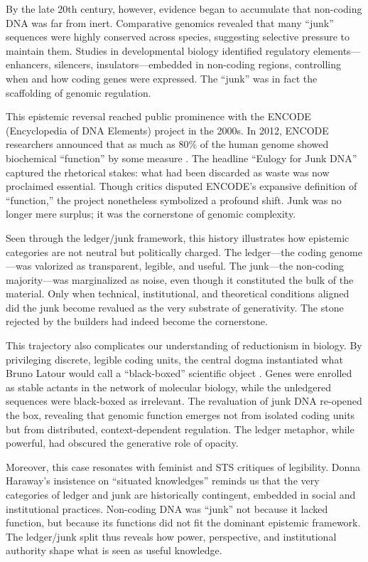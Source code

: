 \documentclass[12pt]{article}
\begin{document}
By the late 20th century, however, evidence began to accumulate that non-coding DNA was far from inert. Comparative genomics revealed that many ``junk'' sequences were highly conserved across species, suggesting selective pressure to maintain them. Studies in developmental biology identified regulatory elements---enhancers, silencers, insulators---embedded in non-coding regions, controlling when and how coding genes were expressed. The ``junk'' was in fact the scaffolding of genomic regulation.

This epistemic reversal reached public prominence with the ENCODE (Encyclopedia of DNA Elements) project in the 2000s. In 2012, ENCODE researchers announced that as much as 80\% of the human genome showed biochemical ``function'' by some measure \citep{encode2012, pennisi2012}. The headline ``Eulogy for Junk DNA'' captured the rhetorical stakes: what had been discarded as waste was now proclaimed essential. Though critics disputed ENCODE’s expansive definition of ``function,'' the project nonetheless symbolized a profound shift. Junk was no longer mere surplus; it was the cornerstone of genomic complexity.

Seen through the ledger/junk framework, this history illustrates how epistemic categories are not neutral but politically charged. The ledger---the coding genome---was valorized as transparent, legible, and useful. The junk---the non-coding majority---was marginalized as noise, even though it constituted the bulk of the material. Only when technical, institutional, and theoretical conditions aligned did the junk become revalued as the very substrate of generativity. The stone rejected by the builders had indeed become the cornerstone.

This trajectory also complicates our understanding of reductionism in biology. By privileging discrete, legible coding units, the central dogma instantiated what Bruno Latour would call a ``black-boxed'' scientific object \citep{latour1987}. Genes were enrolled as stable actants in the network of molecular biology, while the unledgered sequences were black-boxed as irrelevant. The revaluation of junk DNA re-opened the box, revealing that genomic function emerges not from isolated coding units but from distributed, context-dependent regulation. The ledger metaphor, while powerful, had obscured the generative role of opacity.

Moreover, this case resonates with feminist and STS critiques of legibility. Donna Haraway’s insistence on ``situated knowledges'' \citep{haraway1988} reminds us that the very categories of ledger and junk are historically contingent, embedded in social and institutional practices. Non-coding DNA was ``junk'' not because it lacked function, but because its functions did not fit the dominant epistemic framework. The ledger/junk split thus reveals how power, perspective, and institutional authority shape what is seen as useful knowledge.
\end{document}
